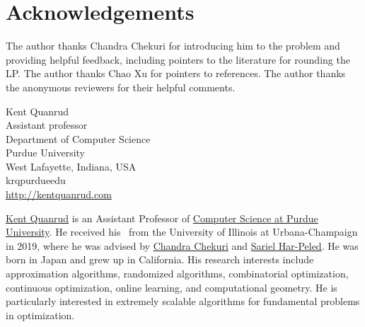 \documentclass{toc}
\begin{document}
\section*{Acknowledgements}
The author thanks Chandra Chekuri for introducing him to the problem
and providing helpful feedback, including pointers to the literature
for rounding the LP. The author thanks Chao Xu for pointers to
references. The author thanks the anonymous reviewers for their
helpful comments.

%

%

%
%
%

%
%
%
%



%
%
%
%
%
\begin{tocauthors}
  \begin{tocinfo}[quanrud]
    Kent Quanrud\\
    Assistant professor\\
    Department of Computer Science\\
    Purdue University\\
    West Lafayette, Indiana, USA\\
    krq\tocat{}purdue\tocdot{}edu \\ %
    \url{http://kentquanrud.com} %
  \end{tocinfo}
\end{tocauthors}

%
%
%
%
%
%
%
%
%
%
%
%
%
%
\begin{tocaboutauthors}
  \begin{tocabout}[quanrud]  %
    \href{https://kentquanrud.com}{Kent Quanrud} is an Assistant
    Professor of \href{https://www.cs.purdue.edu}{Computer Science at
      Purdue University}. He received his \phd\ from the University of
    Illinois at Urbana-Champaign in 2019, where he was advised by
    \href{http://chekuri.cs.illinois.edu}{Chandra Chekuri} and
    \href{https://sarielhp.org}{Sariel Har-Peled}.  He was born in
    Japan and grew up in California. His research interests include
    approximation algorithms, randomized algorithms, combinatorial
    optimization, continuous optimization, online learning, and
    computational geometry. He is particularly interested in extremely
    scalable algorithms for fundamental problems in optimization.
  \end{tocabout}
\end{tocaboutauthors}

%
\end{document}
